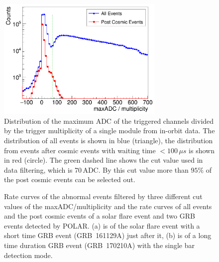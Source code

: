 \documentclass[preprint,sort&compress,12pt]{elsarticle}
\begin{document}
\begin{figure}[!ht]
\centering
\includegraphics[width=8cm]{images/maxadcdm_05.png}
\caption{Distribution of the maximum ADC of the triggered channels divided by the trigger multiplicity of a single module from in-orbit data. The distribution of all events is shown in blue (triangle), the distribution from events after cosmic events with waiting time $<100\,\mu s$ is shown in red (circle). The green dashed line shows the cut value used in data filtering, which is 70\,ADC. By this cut value more than $95\%$ of the post cosmic events can be selected out.}\label{fig:max_adc_dm}
\end{figure}

\begin{figure}[!ht]
\centering
{}
\hspace{1mm}
\caption{Rate curves of the abnormal events filtered by three different cut values of the maxADC/multiplicity and the rate curves of all events and the post cosmic events of a solar flare event and two GRB events detected by POLAR. (a) is of the solar flare event with a short time GRB event (GRB~161129A) just after it, (b) is of a long time duration GRB event (GRB~170210A) with the single bar detection mode.}\label{fig:data_filtering}
\end{figure}
\end{document}
